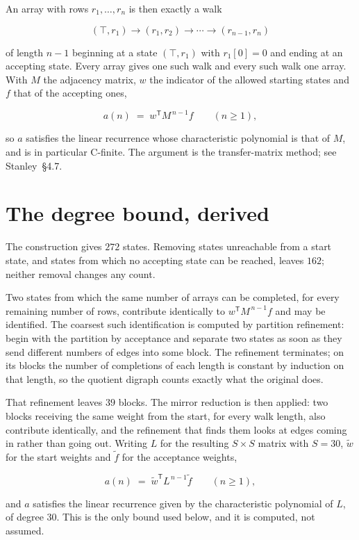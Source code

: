 \documentclass[11pt]{article}
\theoremstyle{definition}
\begin{document}
An array with rows $r_1,\dots,r_n$ is then exactly a walk

\[(\top,r_1) \to (r_1,r_2) \to \cdots \to (r_{n-1},r_n)\]

of length $n-1$ beginning at a state $(\top,r_1)$ with $r_1[0]=0$ and ending at an accepting state. Every array gives one such walk and every such walk one array. With $M$ the adjacency matrix, $w$ the indicator of the allowed starting states and $f$ that of the accepting ones,

\[a(n) \;=\; w^{\mathsf T} M^{\,n-1} f \qquad (n \ge 1),\]

so $a$ satisfies the linear recurrence whose characteristic polynomial is that of $M$, and is in particular C-finite. The argument is the transfer-matrix method; see Stanley~\S4.7.

\section{The degree bound, derived}

The construction gives $272$ states. Removing states unreachable from a start state, and states from which no accepting state can be reached, leaves $162$; neither removal changes any count.

Two states from which the same number of arrays can be completed, for every remaining number of rows, contribute identically to $w^{\mathsf T}M^{\,n-1}f$ and may be identified. The coarsest such identification is computed by partition refinement: begin with the partition by acceptance and separate two states as soon as they send different numbers of edges into some block. The refinement terminates; on its blocks the number of completions of each length is constant by induction on that length, so the quotient digraph counts exactly what the original does.

That refinement leaves $39$ blocks. The mirror reduction is then applied: two blocks receiving the same weight from the start, for every walk length, also contribute identically, and the refinement that finds them looks at edges coming in rather than going out. Writing $L$ for the resulting $S \times S$ matrix with $S = 30$, $\tilde w$ for the start weights and $\tilde f$ for the acceptance weights,

\[a(n) \;=\; \tilde w^{\mathsf T} L^{\,n-1} \tilde f \qquad (n \ge 1),\]

and $a$ satisfies the linear recurrence given by the characteristic polynomial of $L$, of degree $30$. This is the only bound used below, and it is computed, not assumed.
\end{document}

